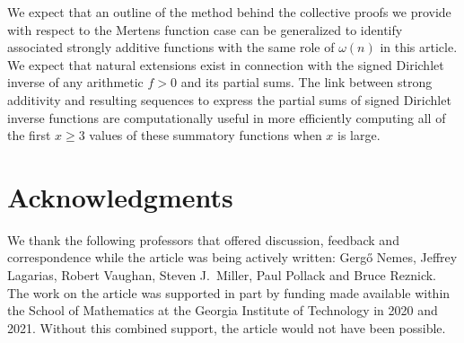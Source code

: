 \documentclass[11pt,reqno,a4letter]{article}
\numberwithin{equation}{section}
\numberwithin{figure}{section}
\numberwithin{table}{section}
\theoremstyle{plain}
\numberwithin{theorem}{section}
\theoremstyle{definition}
\begin{document}
We expect that an outline of the method behind the collective proofs we 
provide with respect to the Mertens function case can be generalized to identify 
associated strongly additive functions with the same role of $\omega(n)$ in this article. 
We expect that natural extensions exist in connection with the signed Dirichlet inverse 
of any arithmetic $f > 0$ and its partial sums. 
The link between strong additivity and resulting 
sequences to express the partial sums of signed Dirichlet inverse functions 
are computationally useful in more efficiently computing all of the 
first $x \geq 3$ values of these summatory functions when $x$ is large.  

\section*{Acknowledgments}

We thank the following professors that offered 
discussion, feedback and correspondence while the article was being actively written: 
Gerg\H{o} Nemes, Jeffrey Lagarias, Robert Vaughan, Steven J.~Miller, 
Paul Pollack and Bruce Reznick. 
The work on the article was supported in part by 
funding made available within the School of Mathematics at the 
Georgia Institute of Technology in 2020 and 2021. 
Without this combined support, the article would not have been possible.

\renewcommand{\refname}{References} 

\end{document}
